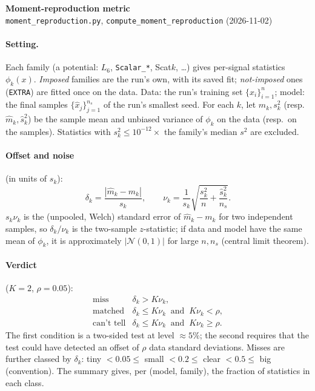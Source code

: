 \documentclass[11pt]{article}
\begin{document}
\begin{center}
{\large\bfseries Moment-reproduction metric}\\[2pt]
{\small \texttt{moment\_reproduction.py}, \texttt{compute\_moment\_reproduction} (2026-11-02)}
\end{center}

\paragraph{Setting.}
Each family (a potential: $L_6$, \texttt{Scalar\_*}, Scat$k$, \dots) gives per-signal statistics $\phi_k(x)$.
\emph{Imposed} families are the run's own, with its saved fit; \emph{not-imposed} ones (\texttt{EXTRA}) are fitted
once on the data. Data: the run's training set $\{x_i\}_{i=1}^{n}$; model: the final samples
$\{\hat x_j\}_{j=1}^{n_s}$ of the run's smallest seed. For each $k$, let $m_k, s_k^2$ (resp.\ $\hat m_k,\hat s_k^2$)
be the sample mean and unbiased variance of $\phi_k$ on the data (resp.\ on the samples). Statistics with
$s_k^2\le10^{-12}\times$ the family's median $s^2$ are excluded.

\paragraph{Offset and noise} (in units of $s_k$):
\[
\delta_k=\frac{|\hat m_k-m_k|}{s_k},
\qquad
\nu_k=\frac{1}{s_k}\sqrt{\frac{s_k^2}{n}+\frac{\hat s_k^2}{n_s}} .
\]
$s_k\nu_k$ is the (unpooled, Welch) standard error of $\hat m_k-m_k$ for two independent samples, so
$\delta_k/\nu_k$ is the two-sample $z$-statistic; if data and model have the same mean of $\phi_k$, it is
approximately $|\mathcal N(0,1)|$ for large $n,n_s$ (central limit theorem).

\paragraph{Verdict} ($K=2$, $\rho=0.05$):
\[
\begin{array}{ll}
\text{miss} & \delta_k> K\nu_k,\\[2pt]
\text{matched} & \delta_k\le K\nu_k\ \text{ and }\ K\nu_k<\rho,\\[2pt]
\text{can't tell} & \delta_k\le K\nu_k\ \text{ and }\ K\nu_k\ge\rho .
\end{array}
\]
The first condition is a two-sided test at level $\approx5\%$; the second requires that the test could have detected
an offset of $\rho$ data standard deviations.
Misses are further classed by $\delta_k$: tiny $<0.05\le$ small $<0.2\le$ clear $<0.5\le$ big (convention).
The summary gives, per (model, family), the fraction of statistics in each class.
\end{document}
